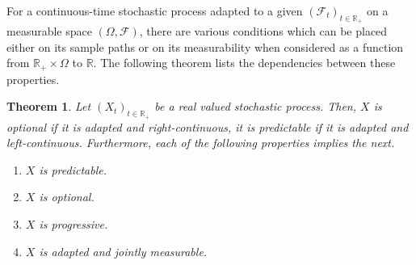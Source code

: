\documentclass[12pt]{article}
\newtheorem*{theorem*}{Theorem}
\begin{document}
For a continuous-time stochastic process adapted to a given  $(\mathcal{F}_t)_{t\in\mathbb{R}_+}$ on a measurable space $(\Omega,\mathcal{F})$, there are various conditions which can be placed either on its sample paths or on its measurability when considered as a function from $\mathbb{R}_+\times\Omega$ to $\mathbb{R}$. The following theorem lists the dependencies between these properties.

\begin{theorem*}
Let $(X_t)_{t\in\mathbb{R}_+}$ be a real valued stochastic process.
Then, $X$ is optional if it is adapted and right-continuous, it is predictable if it is adapted and left-continuous. Furthermore, each of the following properties implies the next.
\begin{enumerate}
\item $X$ is predictable.
\item $X$ is optional.
\item $X$ is progressive.
\item $X$ is adapted and jointly measurable.
\end{enumerate}
\end{theorem*}

\end{document}
